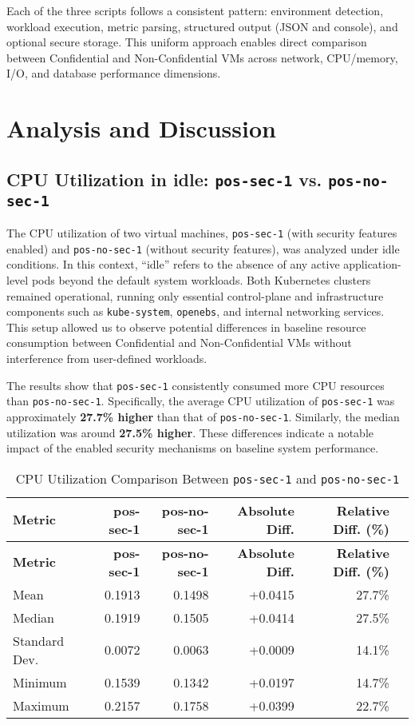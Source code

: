 Each of the three scripts follows a consistent pattern: environment detection, workload execution, metric parsing, structured output (JSON and console), and optional secure storage. This uniform approach enables direct comparison between Confidential and Non-Confidential VMs across network, CPU/memory, I/O, and database performance dimensions.


\section{Analysis and Discussion}

\subsection{CPU Utilization in idle: \texttt{pos-sec-1} vs. \texttt{pos-no-sec-1}}

The CPU utilization of two virtual machines, \texttt{pos-sec-1} (with security features enabled) and \texttt{pos-no-sec-1} (without security features), was analyzed under idle conditions. In this context, \enquote{idle} refers to the absence of any active application-level pods beyond the default system workloads. Both Kubernetes clusters remained operational, running only essential control-plane and infrastructure components such as \texttt{kube-system}, \texttt{openebs}, and internal networking services. This setup allowed us to observe potential differences in baseline resource consumption between Confidential and Non-Confidential VMs without interference from user-defined workloads.

The results show that \texttt{pos-sec-1} consistently consumed more CPU resources than \texttt{pos-no-sec-1}. Specifically, the average CPU utilization of \texttt{pos-sec-1} was approximately \textbf{27.7\% higher} than that of \texttt{pos-no-sec-1}. Similarly, the median utilization was around \textbf{27.5\% higher}. These differences indicate a notable impact of the enabled security mechanisms on baseline system performance.

\begin{longtable}{@{}lrrrrr@{}}
\caption{CPU Utilization Comparison Between \texttt{pos-sec-1} and \texttt{pos-no-sec-1}} \\
\toprule
\textbf{Metric} & \textbf{pos-sec-1} & \textbf{pos-no-sec-1} & \textbf{Absolute Diff.} & \textbf{Relative Diff. (\%)} \\ \midrule
\endfirsthead
\toprule
\textbf{Metric} & \textbf{pos-sec-1} & \textbf{pos-no-sec-1} & \textbf{Absolute Diff.} & \textbf{Relative Diff. (\%)} \\ \midrule
\endhead
Mean             & 0.1913   & 0.1498   & +0.0415   & 27.7\% \\
Median           & 0.1919   & 0.1505   & +0.0414   & 27.5\% \\
Standard Dev.    & 0.0072   & 0.0063   & +0.0009   & 14.1\% \\
Minimum          & 0.1539   & 0.1342   & +0.0197   & 14.7\% \\
Maximum          & 0.2157   & 0.1758   & +0.0399   & 22.7\% \\
\bottomrule
\end{longtable}


